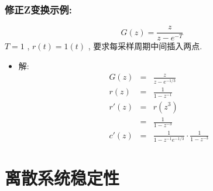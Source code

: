 \documentclass[table]{article}
\begin{document}
\begin{frame}
\frametitle{修正Z变换示例:}
\label{sec-4-5-3}

\[G(z)=\frac{z}{z-e^{-T}}\]
   $T=1$ ,  $r(t)=1(t)$ , 要求每采样周期中间插入两点.

\begin{itemize}
\item 解:
      \begin{eqnarray*}
      G(z) &= & \frac{z}{z-e^{-1/3}} \\
      r(z) &=& \frac{1}{1-z^{-1}} \\
      r'(z) &=& r(z^3) \\
      &=& \frac{1}{1-z^{-3}} \\
      c'(z) &=& \frac{1}{1-z^{-1}e^{-1/3}}\cdot\frac{1}{1-z^{-3}}
      \end{eqnarray*}
\end{itemize}
\end{frame}
\section{离散系统稳定性}
\label{sec-5}
\end{document}
